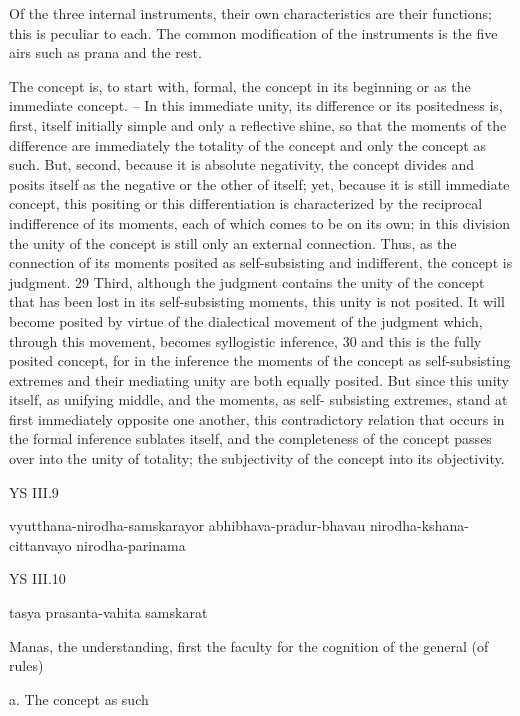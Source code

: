 Of the three internal instruments, their own characteristics are their functions;
this is peculiar to each.
The common modification of the instruments is the five airs
such as prana and the rest.

The concept is, to start with, formal, the concept in its beginning or as
the immediate concept. – In this immediate unity, its difference or its
positedness is, first, itself initially simple and only a reflective shine, so that
the moments of the difference are immediately the totality of the concept
and only the concept as such.
But, second, because it is absolute negativity, the concept divides and
posits itself as the negative or the other of itself; yet, because it is still
immediate concept, this positing or this differentiation is characterized by
the reciprocal indifference of its moments, each of which comes to be on
its own; in this division the unity of the concept is still only an external
connection. Thus, as the connection of its moments posited as self-subsisting
and indifferent, the concept is judgment. 29
Third, although the judgment contains the unity of the concept that
has been lost in its self-subsisting moments, this unity is not posited. It
will become posited by virtue of the dialectical movement of the judgment
which, through this movement, becomes syllogistic inference, 30 and this is
the fully posited concept, for in the inference the moments of the concept
as self-subsisting extremes and their mediating unity are both equally posited.
But since this unity itself, as unifying middle, and the moments, as self-
subsisting extremes, stand at first immediately opposite one another, this
contradictory relation that occurs in the formal inference sublates itself, and
the completeness of the concept passes over into the unity of totality; the
subjectivity of the concept into its objectivity.

YS III.9

vyutthana-nirodha-samskarayor abhibhava-pradur-bhavau nirodha-kshana-cittanvayo nirodha-parinama

YS III.10

tasya prasanta-vahita samskarat

Manas, the understanding, first the faculty for the cognition of the general (of rules)

a. The concept as such

